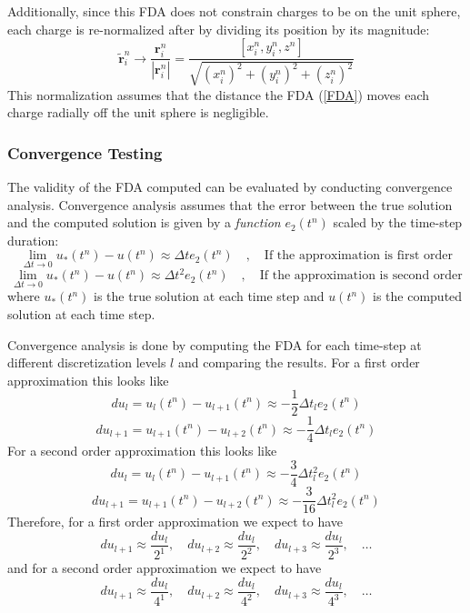 \documentclass[10pt]{article}
\begin{document}
Additionally, since this FDA does not constrain charges to be on the unit sphere, each charge is 
re-normalized after by dividing its position by its magnitude:
\begin{equation}\label{normalization}
\tilde{\mathbf{r}}_i^n \rightarrow \frac{\mathbf{r}_i^n}{\left|\mathbf{r}_i^n \right|}=
\frac{\left[x_i^n, y_i^n, z^n\right]}
{\sqrt{\left(x_i^n\right)^2+\left(y_i^n\right)^2+\left(z_i^n\right)^2}}
\end{equation}
This normalization assumes that the distance the FDA (\ref{FDA}) moves each charge radially off the 
unit sphere is negligible.

\subsubsection*{Convergence Testing}

The validity of the FDA computed can be evaluated by conducting convergence analysis. Convergence 
analysis assumes that the error between the true solution and the computed solution is given by a 
\textit{function} $e_2(t^n)$ scaled by the time-step duration:
$$ \lim_{\Delta t\to 0} u_*(t^n) - u(t^n) \approx \Delta t e_2(t^n) 
\quad , \quad \textrm{If the approximation is first order}$$
$$ \lim_{\Delta t\to 0} u_*(t^n) - u(t^n) \approx \Delta t^2 e_2(t^n) 
\quad , \quad \textrm{If the approximation is second order}$$
where $u_*(t^n)$ is the true solution at each time step and $u(t^n)$ is the computed solution at 
each time step. 

Convergence analysis is done by computing the FDA for each time-step at different discretization levels 
$l$ and comparing the results. For a first order approximation this looks like 
$$du_l = u_l(t^n)-u_{l+1}(t^n) \approx -\frac{1}{2} \Delta t_l e_2(t^n)$$
$$du_{l+1} = u_{l+1}(t^n)-u_{l+2}(t^n) \approx -\frac{1}{4} \Delta t_l e_2(t^n)$$
For a second order approximation this looks like 
$$du_l = u_l(t^n)-u_{l+1}(t^n) \approx -\frac{3}{4} \Delta t_l^2 e_2(t^n)$$
$$du_{l+1} = u_{l+1}(t^n)-u_{l+2}(t^n) \approx -\frac{3}{16} \Delta t_l^2 e_2(t^n)$$
Therefore, for a first order approximation we expect to have 
\begin{equation}\label{first_order}
du_{l+1} \approx \frac{du_l}{2^1} , \quad du_{l+2} \approx \frac{du_l}{2^2} ,
\quad du_{l+3} \approx \frac{du_l}{2^3} , \quad \ldots
\end{equation}
and for a second order approximation we expect to have 
\begin{equation}\label{second_order}
du_{l+1} \approx \frac{du_l}{4^1} , \quad du_{l+2} \approx \frac{du_l}{4^2} , 
\quad du_{l+3} \approx \frac{du_l}{4^3} , \quad \ldots
\end{equation}
\end{document}
